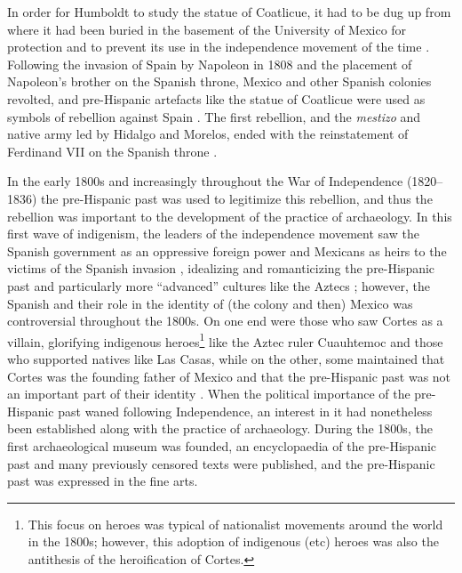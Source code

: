 In order for Humboldt to study the statue of Coatlicue, it had to be dug up from where it had been buried in the basement of the University of Mexico for protection and to prevent its use in the independence movement of the time \parencites[85]{Bernal1980}[10]{Matos1979}[20]{Matos1995}.
Following the invasion of Spain by Napoleon in 1808 and the placement of Napoleon’s brother on the Spanish throne, Mexico and other Spanish colonies revolted, and pre-Hispanic artefacts like the statue of Coatlicue were used as symbols of rebellion against Spain \parencites[20]{Matos1995}[31]{Skidmore1989}. 
The first rebellion, and the \textit{mestizo} and native army led by Hidalgo and Morelos, ended with the reinstatement of Ferdinand VII on the Spanish throne \parencite[31-32]{Skidmore1989}.

In the early 1800s and increasingly throughout the War of Independence (1820–1836) the pre-Hispanic past was used to legitimize this rebellion, and thus the rebellion was important to the development of the practice of archaeology. In this first wave of indigenism, the leaders of the independence movement saw the Spanish government as an oppressive foreign power and Mexicans as heirs to the victims of the Spanish invasion \parencite[336]{Caballero2008}, 
idealizing and romanticizing the pre-Hispanic past and particularly more “advanced” cultures like the Aztecs \parencite[223]{Fowler1987}; 
however, the Spanish and their role in the identity of (the colony and then) Mexico was controversial throughout the 1800s. On one end were those who saw Cortes as a villain, glorifying indigenous heroes\footnote{This focus on heroes was typical of nationalist movements around the world in the 1800s; however, this adoption of indigenous (etc) heroes was also the antithesis of the heroification of Cortes.} like the Aztec ruler Cuauhtemoc and those who supported natives like Las Casas, while on the other, some maintained that Cortes was the founding father of Mexico and that the pre-Hispanic past was not an important part of their identity \parencite[69]{Restall2003}. 
When the political importance of the pre-Hispanic past waned following Independence, an interest in it had nonetheless been established along with the practice of archaeology. During the 1800s, the first archaeological museum was founded, an encyclopaedia of the pre-Hispanic past and many previously censored texts were published, and the pre-Hispanic past was expressed in the fine arts. 


